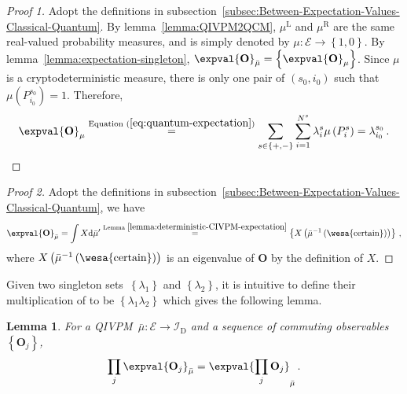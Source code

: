 \documentclass[12pt]{iopart}
\theoremstyle{plain}
\newtheorem{lemma}[thm]{Lemma}
\theoremstyle{definition}
\theoremstyle{remark}
\newcommand{\events}{\ensuremath{\mathcal{E}}}
\newcommand{\necess}{{\mbox{\wesa{certain}}}}
\newcommand{\mul}[1][]{\ensuremath{\mu^{\mathrm{L{#1}}}}}
\newcommand{\mur}[1][]{\ensuremath{\mu^{\mathrm{R{#1}}}}}
\begin{document}
\begin{proof}[Proof 1]Adopt the definitions in subsection~\ref{subsec:Between-Expectation-Values-Classical-Quantum}.
By lemma~\ref{lemma:QIVPM2QCM}, $\mul$ and $\mur$ are the same
real-valued probability measures, and is simply denoted by $\mu:\events\rightarrow\left\{ 1,0\right\} $.
By lemma~\ref{lemma:expectation-singleton}, $\expval{\mathbf{O}}_{\bar{\mu}}=\left\{ \expval{\mathbf{O}}_{\mu}\right\} $.
Since $\mu$ is a cryptodeterministic measure, there is only one pair
of $\left(s_{0},i_{0}\right)$ such that $\mu\left(P_{i_{0}}^{s_{0}}\right)=1$.
Therefore, 
\begin{equation}
\expval{\mathbf{O}}_{\mu}\stackrel{\textrm{Equation }(\ref{eq:quantum-expectation})}{=}\sum_{s\in\left\{ +,-\right\} }\sum_{i=1}^{N^{s}}\lambda_{i}^{s}\mu\left(P_{i}^{s}\right)=\lambda_{i_{0}}^{s_{0}}\,.\label{eq:expectation-value-eigenvalue}
\end{equation}
\end{proof}

\begin{proof}[Proof 2]Adopt the definitions in subsection~\ref{subsec:Between-Expectation-Values-Classical-Quantum},
we have
\begin{equation}
\expval{\mathbf{O}}_{\bar{\mu}}=\int X\rmd\bar{\mu}'\stackrel{\textrm{Lemma }\ref{lemma:deterministic-CIVPM-expectation}}{=}\left\{ X\left(\bar{\mu}^{-1}\left(\necess\right)\right)\right\} \,,
\end{equation}
where $X\left(\bar{\mu}^{-1}\left(\necess\right)\right)$ is an eigenvalue
of $\mathbf{O}$ by the definition of $X$.\end{proof}

Given two singleton sets~$\left\{ \lambda_{1}\right\} $ and $\left\{ \lambda_{2}\right\} $,
it is intuitive to define their multiplication of to be $\left\{ \lambda_{1}\lambda_{2}\right\} $
which gives the following lemma.

\begin{lemma}For a QIVPM~$\bar{\mu}:\events\rightarrow\mathscr{I}_{\mathrm{D}}$
and a sequence of commuting observables~$\left\{ \mathbf{O}_{j}\right\} $,
\begin{equation}
\prod_{j}\expval{\mathbf{O}_{j}}_{\bar{\mu}}=\expval{\prod_{j}\mathbf{O}_{j}}_{\bar{\mu}}\,.\label{eq:Kochen-Specker-Rules}
\end{equation}
\end{lemma}
\end{document}
